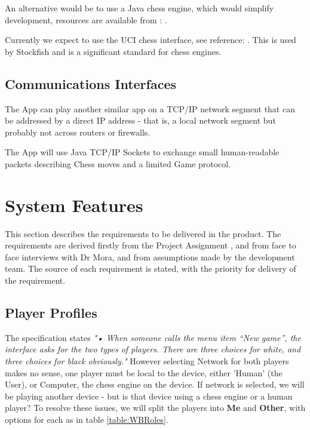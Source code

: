 \documentclass[a4paper,10pt]{article}
\begin{document}
An alternative would be to use a Java chess engine, which would simplify development, resources are available from : \cite{javaChess}.

Currently we expect to use the UCI chess interface, see reference: \cite{UCIInterface}. This is used by Stockfish and is a significant standard for chess engines. 

\subsection{Communications Interfaces}

The App can play another similar app on a TCP/IP network segment that can be addressed by a direct IP address - that is, a local network segment but probably not across routers or firewalls.

The App will use Java TCP/IP Sockets to exchange small human-readable packets describing Chess moves and a limited Game protocol.



\section{System Features}

This section describes the requirements to be delivered in the product. The requirements are derived firstly from the Project Assignment  , and from face to face interviews with Dr Mora, and from assumptions made by the development team. The source of each requirement is stated, with the priority for delivery of the requirement. 


\subsection{Player Profiles}

The specification states \textit{"• When someone calls the menu item “New game”, the interface asks for the two types of players. There are three choices for white, and three choices for black obviously."}
However selecting Network for both players makes no sense, one player must be local to the device, either 'Human' (the User), or Computer, the chess engine on the device.
If network is selected, we will be playing another device - but is that device using a chess engine or a human player? To resolve these issues, we will split the players into \textbf{Me} and \textbf{Other}, with options for each as in table \ref{table:WBRoles}. 
\end{document}
